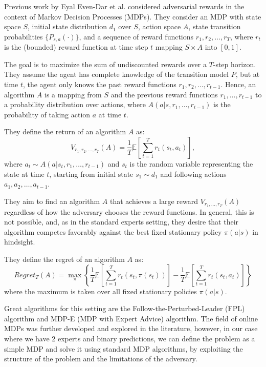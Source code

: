 \documentclass[a4paper, 12pt]{article}
\begin{document}
Previous work by Eyal Even-Dar et al. considered adversarial rewards in the context of Markov Decision Processes (MDPs).
They consider an MDP with state space $S$, initial state distribution $d_1$ over $S$, action space $A$, 
state transition probabilities $\{P_{s,a}(\cdot)\}$, and a sequence of reward functions $r_1, r_2, \ldots, r_T$, 
where $r_t$ is the (bounded) reward function at time step $t$ mapping $S \times A$ into $[0, 1]$.

The goal is to maximize the sum of undiscounted rewards over a $T$-step horizon. 
They assume the agent has complete knowledge of the transition model $P$, but at time $t$, 
the agent only knows the past reward functions $r_1, r_2, \ldots, r_{t-1}$. 
Hence, an algorithm $A$ is a mapping from $S$ and the previous reward functions $r_1, \ldots, r_{t-1}$ to a probability distribution over actions, 
where $A(a|s, r_1, \ldots, r_{t-1})$ is the probability of taking action $a$ at time $t$.

They define the return of an algorithm $A$ as:
\[
V_{r_1, r_2, \ldots, r_T}(A) = \frac{1}{T} \mathbb{E} \left[ \sum_{t=1}^{T} r_t(s_t, a_t) \right],
\]
where $a_t \sim A(a|s_t, r_1, \ldots, r_{t-1})$ and $s_t$ is the random variable representing the state at time $t$, 
starting from initial state $s_1 \sim d_1$ and following actions $a_1, a_2, \ldots, a_{t-1}$.

They aim to find an algorithm $A$ that achieves a large reward $V_{r_1, \ldots, r_T}(A)$ regardless of how the adversary 
chooses the reward functions. 
In general, this is not possible, and, as in the standard experts setting, they desire that their algorithm competes favorably 
against the best fixed stationary policy $\pi(a|s)$ in hindsight.

They define the regret of an algorithm $A$ as:
\[
Regret_T(A) = \max_{\pi} \left\{ \frac{1}{T} \mathbb{E} \left[ \sum_{t=1}^{T} r_t(s_t, \pi(s_t)) \right] - \frac{1}{T} \mathbb{E} \left[ \sum_{t=1}^{T} r_t(s_t, a_t) \right] \right\}
\]
where the maximum is taken over all fixed stationary policies $\pi(a|s)$.

\medskip
Great algorithms for this setting are the Follow-the-Perturbed-Leader (FPL) algorithm and MDP-E (MDP with Expert Advice) algorithm.
The field of online MDPs was further developed and explored in the literature, however, in our case where we have 2 experts and binary predictions,
we can define the problem as a simple MDP and solve it using standard MDP algorithms, by exploiting the structure of the 
problem and the limitations of the adversary.
\end{document}
